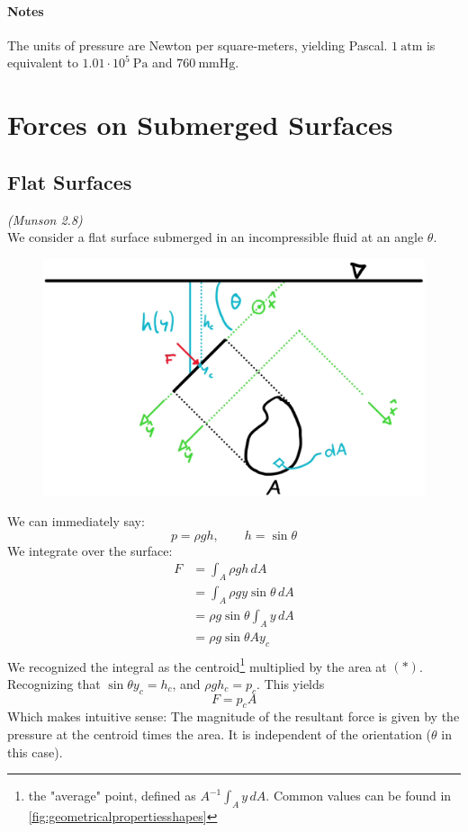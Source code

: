 \paragraph{Notes}
The units of pressure are Newton per square-meters, yielding Pascal. $1\ \mathrm{atm}$ is equivalent to $1.01\cdot 10^5\ \mathrm{Pa}$ and $760\ \mathrm{mmHg}$.

\section{Forces on Submerged Surfaces}

\subsection{Flat Surfaces}
\textit{(Munson 2.8)}\hfill\\

We consider a flat surface submerged in an incompressible fluid at an angle $\theta$. 
\begin{figure}[H]
	\centering
	\includegraphics[width=0.5\linewidth]{Sketches/ForceOnFlatSurface}
	\caption{}
	\label{fig:forceonflatsurface}
\end{figure}

We can immediately say:
\begin{equation*}
	p = \rho gh, \qquad h = \sin\theta
\end{equation*}
We integrate over the surface:
\begin{equation*}
	\begin{split}
		F & =\int_A \rho gh \,dA\\
		&=\int_A \rho gy\sin\theta\, dA\\
		&=\rho g \sin\theta \int_A y\, dA\\
		&= \rho g \sin\theta A y_c\\
	\end{split}
\end{equation*}
We recognized the integral as the centroid\footnote{the "average" point, defined as $A^{-1}\int_A y\,dA$. Common values can be found in \ref{fig:geometricalpropertiesshapes}} multiplied by the area at $(\ast)$. Recognizing that $\sin\theta y_c = h_c$, and $\rho g h_c = p_c$. This yields
\begin{equation}
	\boxed{F=p_c A}
\end{equation}
Which makes intuitive sense: The magnitude of the resultant force is given by the pressure at the centroid times the area. It is independent of the orientation ($\theta$ in this case).

